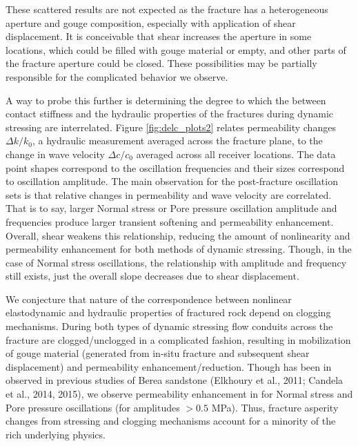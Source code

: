 These scattered results are not expected as the fracture has a heterogeneous aperture and gouge composition, especially with application of shear displacement. It is conceivable that shear increases the aperture in some locations, which could be filled with gouge material or empty, and other parts of the fracture aperture could be closed. These possibilities may be partially responsible for the complicated behavior we observe. 

A way to probe this further is determining the degree to which the between contact stiffness and the hydraulic properties of the fractures during dynamic stressing are interrelated. Figure \ref{fig:delc_plots2} relates permeability changes $ \Delta k/k_0 $, a hydraulic measurement averaged across the fracture plane, to the change in wave velocity $ \Delta c/c_0 $ averaged across all receiver locations. The data point shapes correspond to the oscillation frequencies and their sizes correspond to oscillation amplitude. The main observation for the post-fracture oscillation sets is that relative changes in permeability and wave velocity are correlated. That is to say, larger Normal stress or Pore pressure oscillation amplitude and frequencies produce larger transient softening and permeability enhancement. Overall, shear weakens this relationship, reducing the amount of nonlinearity and permeability enhancement for both methods of dynamic stressing. Though, in the case of Normal stress oscillations, the relationship with amplitude and frequency still exists, just the overall slope decreases due to shear displacement. 

We conjecture that nature of the correspondence between nonlinear elastodynamic and hydraulic properties of fractured rock depend on clogging mechanisms. During both types of dynamic stressing flow conduits across the fracture are clogged/unclogged in a complicated fashion, resulting in mobilization of gouge material (generated from in-situ fracture and subsequent shear displacement) and permeability enhancement/reduction. Though has been in observed in previous studies of Berea sandstone (Elkhoury et al., 2011; Candela et al., 2014, 2015), we observe permeability enhancement in for Normal stress and Pore pressure oscillations (for amplitudes $ > 0.5 $  MPa). Thus, fracture asperity changes from stressing and clogging mechanisms account for a minority of the rich underlying physics.     

